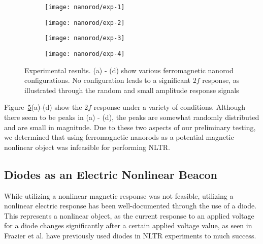  \begin{figure}
     \centering
     \begin{subfigure}{0.45\textwidth}
         \centering
         \texttt{[image: nanorod/exp-1]}
         \caption[]{}
         \label{fig:nanorod-exp-1}
     \end{subfigure}
         \begin{subfigure}{0.45\textwidth}
         \centering
         \texttt{[image: nanorod/exp-2]}
         \caption[]{}
         \label{fig:nanorod-exp-2}
     \end{subfigure}
         \begin{subfigure}{0.45\textwidth}
         \centering
         \texttt{[image: nanorod/exp-3]}
         \caption[]{}
         \label{fig:nanorod-exp-3}
     \end{subfigure}
         \begin{subfigure}{0.45\textwidth}
         \centering
         \texttt{[image: nanorod/exp-4]}
         \caption[]{}
         \label{fig:nanorod-exp-4}
     \end{subfigure}
     \caption[Ferromagnetic nanorod experimental results]{Experimental results. (a) - (d) show various ferromagnetic nanorod configurations. No configuration leads to a significant $2f$ response, as illustrated through the random and small amplitude response signals}
     \label{fig:nanorod-results}
 \end{figure}

  Figure~\ref{fig:nanorod-results}(a)-(d) show the $2f$ response under a variety of conditions. Although there seem to be peaks in (a) - (d), the peaks are somewhat randomly distributed and are small in magnitude. Due to these two aspects of our preliminary testing, we determined that using ferromagnetic nanorods as a potential magnetic nonlinear object was infeasible for performing NLTR.

\subsection{Diodes as an Electric Nonlinear Beacon}

While utilizing a nonlinear magnetic response was not feasible, utilizing a nonlinear electric response has been well-documented through the use of a diode. This represents a nonlinear object, as the current response to an applied voltage for a diode changes significantly after a certain applied voltage value, as seen in Frazier et al. have previously used diodes in NLTR experiments to much success.

